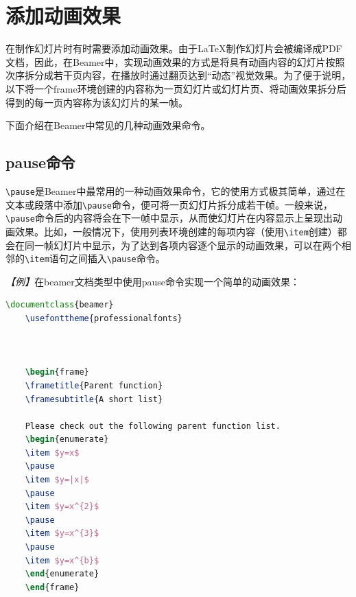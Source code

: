 \section{添加动画效果}

在制作幻灯片时有时需要添加动画效果。由于LaTeX制作幻灯片会被编译成PDF文档，因此，在Beamer中，实现动画效果的方式是将具有动画内容的幻灯片按照次序拆分成若干页内容，在播放时通过翻页达到“动态”视觉效果。为了便于说明，以下将一个frame环境创建的内容称为一页幻灯片或幻灯片页、将动画效果拆分后得到的每一页内容称为该幻灯片的某一帧。

下面介绍在Beamer中常见的几种动画效果命令。

\subsection{pause命令}

\texttt{\textbackslash{}pause}是Beamer中最常用的一种动画效果命令，它的使用方式极其简单，通过在文本或段落中添加\texttt{\textbackslash{}pause}命令，便可将一页幻灯片拆分成若干帧。一般来说，\texttt{\textbackslash{}pause}命令后的内容将会在下一帧中显示，从而使幻灯片在内容显示上呈现出动画效果。比如，一般情况下，使用列表环境创建的每项内容（使用\texttt{\textbackslash{}item}创建）都会在同一帧幻灯片中显示，为了达到各项内容逐个显示的动画效果，可以在两个相邻的\texttt{\textbackslash{}item}语句之间插入\texttt{\textbackslash{}pause}命令。

\emph{【例】}在beamer文档类型中使用pause命令实现一个简单的动画效果：
\begin{lstlisting}[language=TeX]
    \documentclass{beamer}
    \usefonttheme{professionalfonts}

    

    \begin{frame}
    \frametitle{Parent function}
    \framesubtitle{A short list}

    Please check out the following parent function list.
    \begin{enumerate}
    \item $y=x$
    \pause
    \item $y=|x|$
    \pause
    \item $y=x^{2}$
    \pause
    \item $y=x^{3}$
    \pause
    \item $y=x^{b}$
    \end{enumerate}
    \end{frame}

    
\end{lstlisting}

